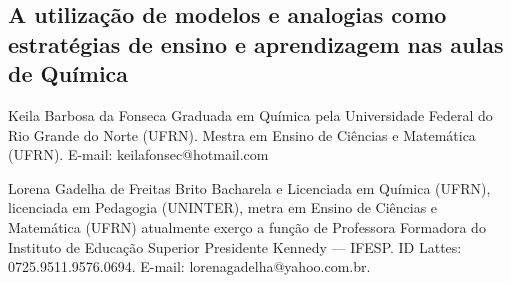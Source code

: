 \begin{refsection}
    \renewcommand{\thefigure}{\arabic{figure}}
    \renewcommand{\thequadro}{\arabic{quadro}}
    
    \chapter[A utilização de modelos e analogias como estratégias de ensino e aprendizagem nas aulas de Química]{A utilização de modelos e analogias como estratégias de ensino e aprendizagem nas aulas de Química}
    \label{chap:utilizacao-modelos}
    
    \articleAuthor
    {Keila Barbosa da Fonseca}
    {Graduada em Química pela Universidade Federal do Rio Grande do Norte (UFRN). Mestra em Ensino de Ciências e Matemática (UFRN). E-mail: keilafonsec@hotmail.com}
    
    \articleAuthor
    {Lorena Gadelha de Freitas Brito}
    {Bacharela e Licenciada em Química (UFRN), licenciada em Pedagogia (UNINTER), metra em Ensino de Ciências e Matemática (UFRN) atualmente exerço a função de Professora Formadora do Instituto de Educação Superior Presidente Kennedy --- IFESP. ID Lattes: 0725.9511.9576.0694. E-mail: lorenagadelha@yahoo.com.br.}
    

\end{refsection}
